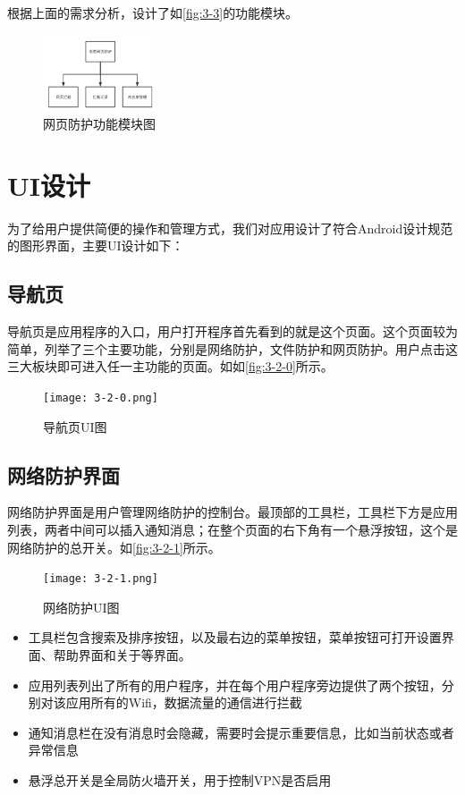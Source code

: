 \documentclass[format=final, language=chinese, degree=fyp]{hustthesis}
\begin{document}
根据上面的需求分析，设计了如\autoref{fig:3-3}的功能模块。
\begin{figure}[!h]
	\centering
	\includegraphics[width=0.3\textwidth]{function_3.png}
	\caption{网页防护功能模块图}\label{fig:3-3}
\end{figure}

\section{UI设计}

为了给用户提供简便的操作和管理方式，我们对应用设计了符合Android设计规范的图形界面，主要UI设计如下：

\subsection{导航页}

导航页是应用程序的入口，用户打开程序首先看到的就是这个页面。这个页面较为简单，列举了三个主要功能，分别是网络防护，文件防护和网页防护。用户点击这三大板块即可进入任一主功能的页面。如如\autoref{fig:3-2-0}所示。

\begin{figure}[!h]
	\centering
	\texttt{[image: 3-2-0.png]}
	\caption{导航页UI图}\label{fig:3-2-0}
\end{figure}

\subsection{网络防护界面}

网络防护界面是用户管理网络防护的控制台。最顶部的工具栏，工具栏下方是应用列表，两者中间可以插入通知消息；在整个页面的右下角有一个悬浮按钮，这个是网络防护的总开关。如\autoref{fig:3-2-1}所示。

\begin{figure}[!h]
	\centering
	\texttt{[image: 3-2-1.png]}
	\caption{网络防护UI图}\label{fig:3-2-1}
\end{figure}

\begin{itemize}
    \item 工具栏包含搜索及排序按钮，以及最右边的菜单按钮，菜单按钮可打开设置界面、帮助界面和关于等界面。
    \item 应用列表列出了所有的用户程序，并在每个用户程序旁边提供了两个按钮，分别对该应用所有的Wifi，数据流量的通信进行拦截
    \item 通知消息栏在没有消息时会隐藏，需要时会提示重要信息，比如当前状态或者异常信息
    \item 悬浮总开关是全局防火墙开关，用于控制VPN是否启用
\end{itemize}
\end{document}
